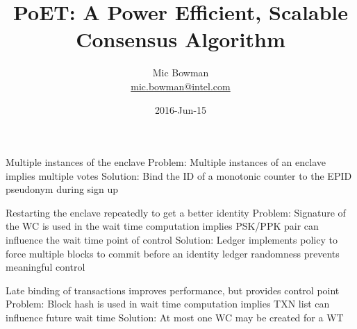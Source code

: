 \documentclass{article}
\title{PoET: A Power Efficient, Scalable Consensus Algorithm }
\author{Mic Bowman \\ \url{mic.bowman@intel.com}}
\date{2016-Jun-15}
\begin{document}
\maketitle












Multiple instances of the enclave
Problem: Multiple instances of an enclave implies multiple votes
Solution: Bind the ID of a monotonic counter to the EPID pseudonym
during sign up 

Restarting the enclave repeatedly to get a better identity
Problem: Signature of the WC is used in the wait time computation
implies PSK/PPK pair can influence the wait time point of control 
Solution: Ledger implements policy to force multiple blocks to commit
before an identity ledger randomness prevents meaningful control

Late binding of transactions improves performance, but provides control point
Problem: Block hash is used in wait time computation implies TXN list can influence future wait time
Solution: At most one WC may be created for a WT
\end{document}
